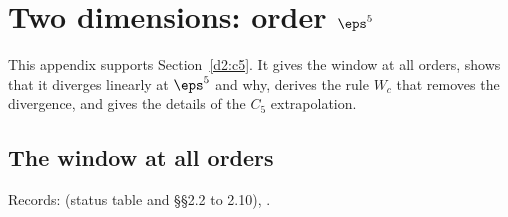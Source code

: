 \section{Two dimensions: order \texorpdfstring{$\eps^5$}{eps5}}\label{d2:app:eps5}

This appendix supports Section~\ref{d2:c5}. It gives the window at all orders, shows that it diverges linearly at
$\eps^5$ and why, derives the rule $W_c$ that removes the divergence, and gives the details of the $C_5$ extrapolation.

\subsection{The window at all orders}\label{d2:app:Wall}
{\small\raggedright\noindent Records:  (status table and \S\S2.2 to 2.10),
.\par}

